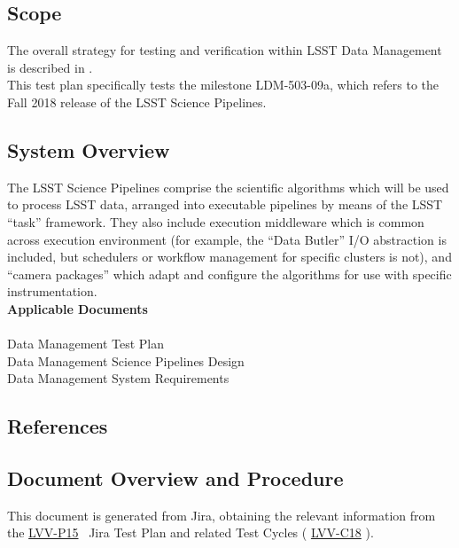 \documentclass[DM,lsstdraft,STR,toc]{lsstdoc}
\begin{document}
\subsection{Scope}\label{scope}

The overall strategy for testing and verification within LSST Data
Management is described in .\\
This test plan specifically tests the milestone LDM-503-09a, which
refers to the Fall 2018 release of the LSST Science Pipelines.



\subsection{System Overview}
\label{sect:systemoverview}

The LSST Science Pipelines comprise the scientific algorithms which will
be used to process LSST data, arranged into executable pipelines by
means of the LSST ``task'' framework. They also include execution
middleware which is common across execution environment (for example,
the ``Data Butler'' I/O abstraction is included, but schedulers or
workflow management for specific clusters is not), and ``camera
packages'' which adapt and configure the algorithms for use with
specific instrumentation.\\[2\baselineskip]\textbf{Applicable
Documents\\
}\\
 Data Management Test Plan\\
 Data Management Science Pipelines Design\\
 Data Management System Requirements


\subsection{References}
\label{sect:references}
\renewcommand{\refname}{}


\subsection{Document Overview and Procedure}
\label{sect:docoverview}

This document is generated from Jira, obtaining the relevant information from the 
\href{https://jira.lsstcorp.org/secure/Tests.jspa#/testPlan/LVV-P15}{LVV-P15}
~Jira Test Plan and related Test Cycles (
\href{https://jira.lsstcorp.org/secure/Tests.jspa#/testCycle/LVV-C18}{LVV-C18}
).
\end{document}
